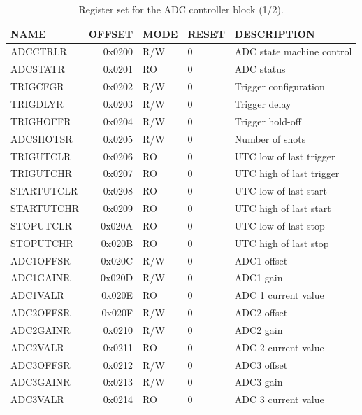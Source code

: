 \documentclass{article}
\begin{document}
\begin{table}[htbp]
  \centering
  \begin{tabularx}{\textwidth}{|l|r|l|l|X|}
    \hline
    \textbf{NAME} & \textbf{OFFSET} & \textbf{MODE} & \textbf{RESET} & \textbf{DESCRIPTION} \\
    \hline
    \hline
    ADCCTRLR & 0x0200 & R/W & 0 & ADC state machine control\\
    \hline
    ADCSTATR & 0x0201 & RO & 0 & ADC status \\
    \hline
    TRIGCFGR & 0x0202 & R/W & 0 & Trigger configuration \\
    \hline
    TRIGDLYR & 0x0203 & R/W & 0 & Trigger delay \\
    \hline
    TRIGHOFFR & 0x0204 & R/W & 0 & Trigger hold-off \\
    \hline
    ADCSHOTSR & 0x0205 & R/W & 0 & Number of shots \\
    \hline
    TRIGUTCLR & 0x0206 & RO & 0 & UTC low of last trigger \\
    \hline
    TRIGUTCHR & 0x0207 & RO & 0 & UTC high of last trigger \\
    \hline
    STARTUTCLR & 0x0208 & RO & 0 & UTC low of last start \\
    \hline
    STARTUTCHR & 0x0209 & RO & 0 & UTC high of last start \\
    \hline
    STOPUTCLR & 0x020A & RO & 0 & UTC low of last stop \\
    \hline
    STOPUTCHR & 0x020B & RO & 0 & UTC high of last stop \\
    \hline
    ADC1OFFSR & 0x020C & R/W & 0 & ADC1 offset \\
    \hline
    ADC1GAINR & 0x020D & R/W & 0 & ADC1 gain \\
    \hline
    ADC1VALR & 0x020E & RO & 0 & ADC 1 current value \\
    \hline
    ADC2OFFSR & 0x020F & R/W & 0 & ADC2 offset \\
    \hline
    ADC2GAINR & 0x0210 & R/W & 0 & ADC2 gain \\
    \hline
    ADC2VALR & 0x0211 & RO & 0 & ADC 2 current value \\
    \hline
    ADC3OFFSR & 0x0212 & R/W & 0 & ADC3 offset \\
    \hline
    ADC3GAINR & 0x0213 & R/W & 0 & ADC3 gain \\
    \hline
    ADC3VALR & 0x0214 & RO & 0 & ADC 3 current value \\
    \hline
  \end{tabularx}
  \caption{Register set for the ADC controller block (1/2).}
  \label{tab:adc_control1}
\end{table}
\end{document}
